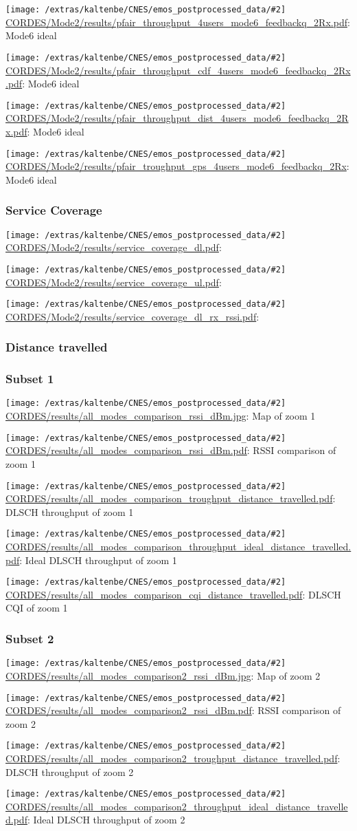 \documentclass[a4paper,10pt]{article}
\newcommand{\printfile}[2][]{
 \begin{minipage}{8cm}
  \centering
  \texttt{[image: /extras/kaltenbe/CNES/emos\_postprocessed\_data/\#2]}
  \url{#2}: #1

 \end{minipage}
}
\begin{document}
\printfile[Mode6 ideal]{CORDES/Mode2/results/pfair_throughput_4users_mode6_feedbackq_2Rx.pdf}
\printfile[Mode6 ideal]{CORDES/Mode2/results/pfair_throughput_cdf_4users_mode6_feedbackq_2Rx.pdf}

\printfile[Mode6 ideal]{CORDES/Mode2/results/pfair_throughput_dist_4users_mode6_feedbackq_2Rx.pdf}
\printfile[Mode6 ideal]{CORDES/Mode2/results/pfair_troughput_gps_4users_mode6_feedbackq_2Rx}


\subsubsection{Service Coverage}

\printfile{CORDES/Mode2/results/service_coverage_dl.pdf}
\printfile{CORDES/Mode2/results/service_coverage_ul.pdf}

\printfile{CORDES/Mode2/results/service_coverage_dl_rx_rssi.pdf}

\subsubsection{Distance travelled}
\label{sec:dist_travelled_cordes}


\subsubsection*{Subset 1}

\printfile[Map of zoom 1]{CORDES/results/all_modes_comparison_rssi_dBm.jpg}
\printfile[RSSI comparison of zoom 1]{CORDES/results/all_modes_comparison_rssi_dBm.pdf}

\printfile[DLSCH throughput of zoom 1]{CORDES/results/all_modes_comparison_troughput_distance_travelled.pdf}
\printfile[Ideal DLSCH throughput of zoom 1]{CORDES/results/all_modes_comparison_throughput_ideal_distance_travelled.pdf}

\printfile[DLSCH CQI of zoom 1]{CORDES/results/all_modes_comparison_cqi_distance_travelled.pdf}

\subsubsection*{Subset 2}

\printfile[Map of zoom 2]{CORDES/results/all_modes_comparison2_rssi_dBm.jpg}
\printfile[RSSI comparison of zoom 2]{CORDES/results/all_modes_comparison2_rssi_dBm.pdf}

\printfile[DLSCH throughput of zoom 2]{CORDES/results/all_modes_comparison2_troughput_distance_travelled.pdf}
\printfile[Ideal DLSCH throughput of zoom 2]{CORDES/results/all_modes_comparison2_throughput_ideal_distance_travelled.pdf}
\end{document}
